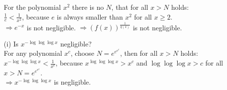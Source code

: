 \begin{itemize}
		For the polynomial \(x^{2}\) there is no \(N\), that for all \(x > N\) holds: \\
		\(\frac{1}{e}  < \frac{1}{x^2}\), because \(e\) is always smaller than \(x^{2}\) for all \(x \ge 2\).\\
		\( \Rightarrow e^{-x}\) is not negligible.	\(\Rightarrow (f(x))^\frac{1}{q(x)}\) is not negligible.
\item[(i)]
		Is \(x^{-\log \log \log x}\) negligible?\\
		For any polynomial \(x^c\), choose \(N=e^{e^{e^c}}\), then for all \(x > N\) holds:\\
		\(x^{-\log \log \log x} < \frac{1}{x^c}\), because \(x^{\log \log \log x} > x^c\) and \(\log \log \log x > c\) for all \(x > N = e^{e^{e^c}}\).\\
		\( \Rightarrow x^{-\log \log \log x}\) is negligible.
\end{itemize}

